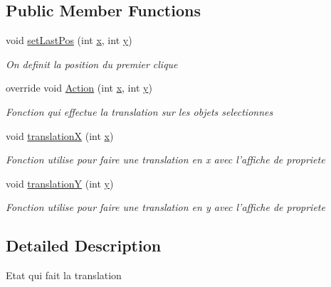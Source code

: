 \subsection*{Public Member Functions}
\begin{DoxyCompactItemize}
\item 
void \hyperlink{class_interface_graphique_1_1patron__state_1_1_translation_state_af59b2b8b1160afb218305427f7499f9d}{set\-Last\-Pos} (int \hyperlink{group__inf2990_ga6150e0515f7202e2fb518f7206ed97dc}{x}, int \hyperlink{group__inf2990_ga0a2f84ed7838f07779ae24c5a9086d33}{y})
\begin{DoxyCompactList}\small\item\em On definit la position du premier clique \end{DoxyCompactList}\item 
override void \hyperlink{class_interface_graphique_1_1patron__state_1_1_translation_state_ab5ba5dd1c3941c219f81d01dbcfe2a60}{Action} (int \hyperlink{group__inf2990_ga6150e0515f7202e2fb518f7206ed97dc}{x}, int \hyperlink{group__inf2990_ga0a2f84ed7838f07779ae24c5a9086d33}{y})
\begin{DoxyCompactList}\small\item\em Fonction qui effectue la translation sur les objets selectionnes \end{DoxyCompactList}\item 
void \hyperlink{class_interface_graphique_1_1patron__state_1_1_translation_state_a6d21be9b23eddc861d82debe536ce3fc}{translation\-X} (int \hyperlink{group__inf2990_ga6150e0515f7202e2fb518f7206ed97dc}{x})
\begin{DoxyCompactList}\small\item\em Fonction utilise pour faire une translation en x avec l'affiche de propriete \end{DoxyCompactList}\item 
void \hyperlink{class_interface_graphique_1_1patron__state_1_1_translation_state_af2d245a91f238ff1c53fad89e94f549e}{translation\-Y} (int \hyperlink{group__inf2990_ga0a2f84ed7838f07779ae24c5a9086d33}{y})
\begin{DoxyCompactList}\small\item\em Fonction utilise pour faire une translation en y avec l'affiche de propriete \end{DoxyCompactList}\end{DoxyCompactItemize}


\subsection{Detailed Description}
Etat qui fait la translation 



